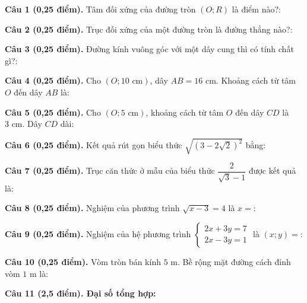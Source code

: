 \documentclass[12pt,a4paper]{article}
\begin{document}
\vspace{1.2mm}
\noindent\textbf{Câu 1 (0,25 điểm).} Tâm đối xứng của đường tròn $(O; R)$ là điểm nào?: \par\vspace{0.6mm}
\noindent\textbf{Câu 2 (0,25 điểm).} Trục đối xứng của một đường tròn là đường thẳng nào?: \par\vspace{0.6mm}
\noindent\textbf{Câu 3 (0,25 điểm).} Đường kính vuông góc với một dây cung thì có tính chất gì?: \par\vspace{0.6mm}
\noindent\textbf{Câu 4 (0,25 điểm).} Cho $(O; 10\text{ cm})$, dây $AB = 16\text{ cm}$. Khoảng cách từ tâm $O$ đến dây $AB$ là: \par\vspace{0.6mm}
\noindent\textbf{Câu 5 (0,25 điểm).} Cho $(O; 5\text{ cm})$, khoảng cách từ tâm $O$ đến dây $CD$ là $3\text{ cm}$. Dây $CD$ dài: \par\vspace{0.6mm}
\noindent\textbf{Câu 6 (0,25 điểm).} Kết quả rút gọn biểu thức $\sqrt{(3 - 2\sqrt{2})^2}$ bằng: \par\vspace{0.6mm}
\noindent\textbf{Câu 7 (0,25 điểm).} Trục căn thức ở mẫu của biểu thức $\dfrac{2}{\sqrt{3}-1}$ được kết quả là: \par\vspace{0.6mm}
\noindent\textbf{Câu 8 (0,25 điểm).} Nghiệm của phương trình $\sqrt{x - 3} = 4$ là $x = $: \par\vspace{0.6mm}
\noindent\textbf{Câu 9 (0,25 điểm).} Nghiệm của hệ phương trình $\begin{cases} 2x + 3y = 7 \\ 2x - 3y = 1 \end{cases}$ là $(x; y) = $: \par\vspace{0.6mm}
\noindent\textbf{Câu 10 (0,25 điểm).} Vòm tròn bán kính $5\text{ m}$. Bề rộng mặt đường cách đỉnh vòm $1\text{ m}$ là: \par\vspace{0.6mm}
\vspace{0.8mm}
\noindent\textbf{Câu 11 (2,5 điểm). Đại số tổng hợp:}
\vspace{0.6mm}
\end{document}

